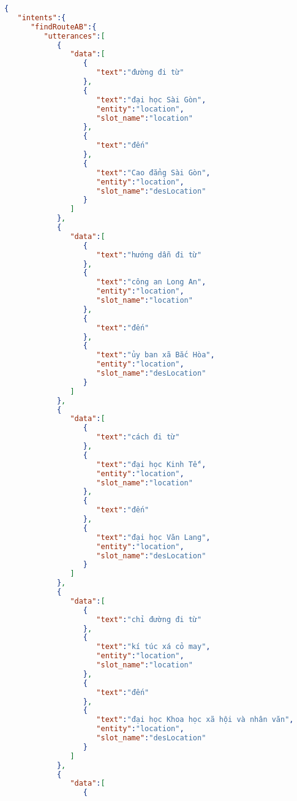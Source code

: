 \UseRawInputEncoding
\begin{lstlisting}[language=json,firstnumber=1]
{
   "intents":{
      "findRouteAB":{
         "utterances":[
            {
               "data":[
                  {
                     "text":"đường đi từ"
                  },
                  {
                     "text":"đại học Sài Gòn",
                     "entity":"location",
                     "slot_name":"location"
                  },
                  {
                     "text":"đến"
                  },
                  {
                     "text":"Cao đẳng Sài Gòn",
                     "entity":"location",
                     "slot_name":"desLocation"
                  }
               ]
            },
            {
               "data":[
                  {
                     "text":"hướng dẫn đi từ"
                  },
                  {
                     "text":"công an Long An",
                     "entity":"location",
                     "slot_name":"location"
                  },
                  {
                     "text":"đến"
                  },
                  {
                     "text":"ủy ban xã Bắc Hòa",
                     "entity":"location",
                     "slot_name":"desLocation"
                  }
               ]
            },
            {
               "data":[
                  {
                     "text":"cách đi từ"
                  },
                  {
                     "text":"đại học Kinh Tế",
                     "entity":"location",
                     "slot_name":"location"
                  },
                  {
                     "text":"đến"
                  },
                  {
                     "text":"đại học Văn Lang",
                     "entity":"location",
                     "slot_name":"desLocation"
                  }
               ]
            },
            {
               "data":[
                  {
                     "text":"chỉ đường đi từ"
                  },
                  {
                     "text":"kí túc xá cỏ may",
                     "entity":"location",
                     "slot_name":"location"
                  },
                  {
                     "text":"đến"
                  },
                  {
                     "text":"đại học Khoa học xã hội và nhân văn",
                     "entity":"location",
                     "slot_name":"desLocation"
                  }
               ]
            },
            {
               "data":[
                  {

\end{lstlisting}
